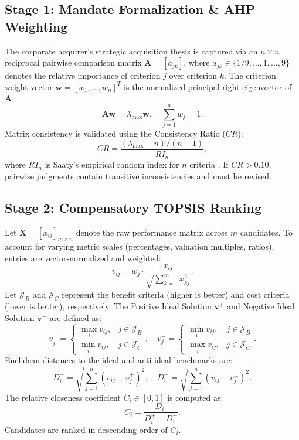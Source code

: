 \documentclass[conference]{IEEEtran}
\begin{document}
\subsection{Stage 1: Mandate Formalization \& AHP Weighting}
The corporate acquirer's strategic acquisition thesis is captured via an $n \times n$ reciprocal pairwise comparison matrix $\mathbf{A} = [a_{jk}]$, where $a_{jk} \in \{1/9, \dots, 1, \dots, 9\}$ denotes the relative importance of criterion $j$ over criterion $k$. The criterion weight vector $\mathbf{w} = [w_1, \dots, w_n]^T$ is the normalized principal right eigenvector of $\mathbf{A}$:
\begin{equation}
\mathbf{A}\mathbf{w} = \lambda_{\max}\mathbf{w}, \quad \sum_{j=1}^n w_j = 1.
\end{equation}
Matrix consistency is validated using the Consistency Ratio ($CR$):
\begin{equation}
CR = \frac{(\lambda_{\max} - n) / (n - 1)}{RI_n},
\label{eq:cr}
\end{equation}
where $RI_n$ is Saaty's empirical random index for $n$ criteria \cite{saaty1980analytic}. If $CR > 0.10$, pairwise judgments contain transitive inconsistencies and must be revised.

\subsection{Stage 2: Compensatory TOPSIS Ranking}
Let $\mathbf{X} = [x_{ij}]_{m \times n}$ denote the raw performance matrix across $m$ candidates. To account for varying metric scales (percentages, valuation multiples, ratios), entries are vector-normalized and weighted:
\begin{equation}
v_{ij} = w_j \cdot \frac{x_{ij}}{\sqrt{\sum_{k=1}^m x_{kj}^2}}.
\end{equation}
Let $\mathcal{J}_B$ and $\mathcal{J}_C$ represent the benefit criteria (higher is better) and cost criteria (lower is better), respectively. The Positive Ideal Solution $\mathbf{v}^+$ and Negative Ideal Solution $\mathbf{v}^-$ are defined as:
\begin{equation}
v_j^+ = \begin{cases} \max_i v_{ij}, & j \in \mathcal{J}_B \\ \min_i v_{ij}, & j \in \mathcal{J}_C \end{cases}, \quad
v_j^- = \begin{cases} \min_i v_{ij}, & j \in \mathcal{J}_B \\ \max_i v_{ij}, & j \in \mathcal{J}_C \end{cases}.
\end{equation}
Euclidean distances to the ideal and anti-ideal benchmarks are:
\begin{equation}
D_i^+ = \sqrt{\sum_{j=1}^n (v_{ij} - v_j^+)^2}, \quad D_i^- = \sqrt{\sum_{j=1}^n (v_{ij} - v_j^-)^2}.
\end{equation}
The relative closeness coefficient $C_i \in [0, 1]$ is computed as:
\begin{equation}
C_i = \frac{D_i^-}{D_i^+ + D_i^-}.
\label{eq:ci}
\end{equation}
Candidates are ranked in descending order of $C_i$.
\end{document}
